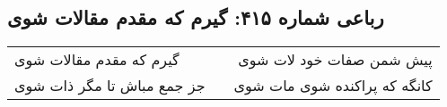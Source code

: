 \begin{center}
\section*{رباعی شماره ۴۱۵: گیرم که مقدم مقالات شوی}
\label{sec:sh415}
\begin{longtable}{l p{0.5cm} r}
گیرم که مقدم مقالات شوی
&&
پیش شمن صفات خود لات شوی
\\
جز جمع مباش تا مگر ذات شوی
&&
کانگه که پراکنده شوی مات شوی
\\
\end{longtable}
\end{center}
